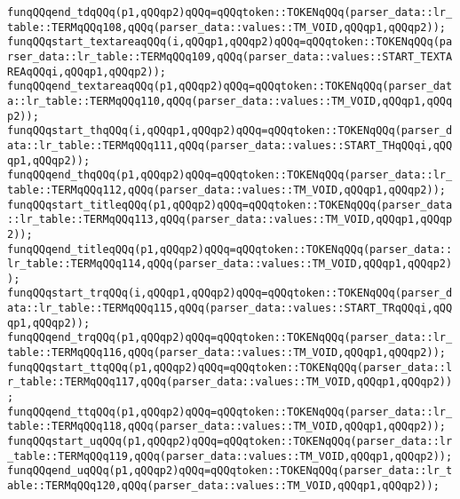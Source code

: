 \verb|funqQQqend_tdqQQq(p1,qQQqp2)qQQq=qQQqtoken::TOKENqQQq(parser_data::lr_table::TERMqQQq108,qQQq(parser_data::values::TM_VOID,qQQqp1,qQQqp2));|\newline
\verb|funqQQqstart_textareaqQQq(i,qQQqp1,qQQqp2)qQQq=qQQqtoken::TOKENqQQq(parser_data::lr_table::TERMqQQq109,qQQq(parser_data::values::START_TEXTAREAqQQqi,qQQqp1,qQQqp2));|\newline
\verb|funqQQqend_textareaqQQq(p1,qQQqp2)qQQq=qQQqtoken::TOKENqQQq(parser_data::lr_table::TERMqQQq110,qQQq(parser_data::values::TM_VOID,qQQqp1,qQQqp2));|\newline
\verb|funqQQqstart_thqQQq(i,qQQqp1,qQQqp2)qQQq=qQQqtoken::TOKENqQQq(parser_data::lr_table::TERMqQQq111,qQQq(parser_data::values::START_THqQQqi,qQQqp1,qQQqp2));|\newline
\verb|funqQQqend_thqQQq(p1,qQQqp2)qQQq=qQQqtoken::TOKENqQQq(parser_data::lr_table::TERMqQQq112,qQQq(parser_data::values::TM_VOID,qQQqp1,qQQqp2));|\newline
\verb|funqQQqstart_titleqQQq(p1,qQQqp2)qQQq=qQQqtoken::TOKENqQQq(parser_data::lr_table::TERMqQQq113,qQQq(parser_data::values::TM_VOID,qQQqp1,qQQqp2));|\newline
\verb|funqQQqend_titleqQQq(p1,qQQqp2)qQQq=qQQqtoken::TOKENqQQq(parser_data::lr_table::TERMqQQq114,qQQq(parser_data::values::TM_VOID,qQQqp1,qQQqp2));|\newline
\verb|funqQQqstart_trqQQq(i,qQQqp1,qQQqp2)qQQq=qQQqtoken::TOKENqQQq(parser_data::lr_table::TERMqQQq115,qQQq(parser_data::values::START_TRqQQqi,qQQqp1,qQQqp2));|\newline
\verb|funqQQqend_trqQQq(p1,qQQqp2)qQQq=qQQqtoken::TOKENqQQq(parser_data::lr_table::TERMqQQq116,qQQq(parser_data::values::TM_VOID,qQQqp1,qQQqp2));|\newline
\verb|funqQQqstart_ttqQQq(p1,qQQqp2)qQQq=qQQqtoken::TOKENqQQq(parser_data::lr_table::TERMqQQq117,qQQq(parser_data::values::TM_VOID,qQQqp1,qQQqp2));|\newline
\verb|funqQQqend_ttqQQq(p1,qQQqp2)qQQq=qQQqtoken::TOKENqQQq(parser_data::lr_table::TERMqQQq118,qQQq(parser_data::values::TM_VOID,qQQqp1,qQQqp2));|\newline
\verb|funqQQqstart_uqQQq(p1,qQQqp2)qQQq=qQQqtoken::TOKENqQQq(parser_data::lr_table::TERMqQQq119,qQQq(parser_data::values::TM_VOID,qQQqp1,qQQqp2));|\newline
\verb|funqQQqend_uqQQq(p1,qQQqp2)qQQq=qQQqtoken::TOKENqQQq(parser_data::lr_table::TERMqQQq120,qQQq(parser_data::values::TM_VOID,qQQqp1,qQQqp2));|\newline
